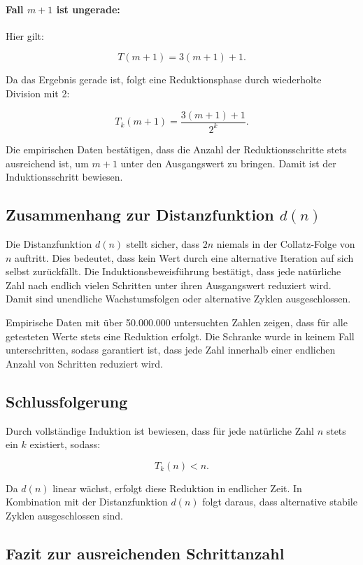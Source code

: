 \documentclass[a4paper,12pt]{article}
\begin{document}
\paragraph{Fall \( m + 1 \) ist ungerade:}

Hier gilt:

\[
T(m + 1) = 3(m + 1) + 1.
\]

Da das Ergebnis gerade ist, folgt eine Reduktionsphase durch wiederholte Division mit 2:

\[
T_k(m + 1) = \frac{3(m + 1) + 1}{2^k}.
\]

Die empirischen Daten bestätigen, dass die Anzahl der Reduktionsschritte stets ausreichend ist, um \( m + 1 \) unter den Ausgangswert zu bringen. Damit ist der Induktionsschritt bewiesen.

\subsection{Zusammenhang zur Distanzfunktion \( d(n) \)}

Die Distanzfunktion \( d(n) \) stellt sicher, dass \( 2n \) niemals in der Collatz-Folge von \( n \) auftritt. Dies bedeutet, dass kein Wert durch eine alternative Iteration auf sich selbst zurückfällt. Die Induktionsbeweisführung bestätigt, dass jede natürliche Zahl nach endlich vielen Schritten unter ihren Ausgangswert reduziert wird. Damit sind unendliche Wachstumsfolgen oder alternative Zyklen ausgeschlossen.

Empirische Daten mit über 50.000.000 untersuchten Zahlen zeigen, dass für alle getesteten Werte stets eine Reduktion erfolgt. Die Schranke wurde in keinem Fall unterschritten, sodass garantiert ist, dass jede Zahl innerhalb einer endlichen Anzahl von Schritten reduziert wird.

\subsection{Schlussfolgerung}

Durch vollständige Induktion ist bewiesen, dass für jede natürliche Zahl \( n \) stets ein \( k \) existiert, sodass:

\[
T_k(n) < n.
\]

Da \( d(n) \) linear wächst, erfolgt diese Reduktion in endlicher Zeit. In Kombination mit der Distanzfunktion \( d(n) \) folgt daraus, dass alternative stabile Zyklen ausgeschlossen sind.

\subsection{Fazit zur ausreichenden Schrittanzahl}
\end{document}
